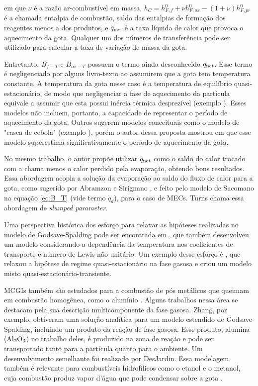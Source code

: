 em que $\nu$ é a razão ar-combustível em massa, $h_C=h^0_{F,f} + \nu h^0_{F,ox} - (1+\nu)h^0_{F,pr}$ é a chamada entalpia de combustão, saldo das entalpias de formação dos reagentes menos a dos produtos, e $\dot q_{\mathrm{net}}$ é a taxa líquida de calor que provoca o aquecimento da gota.
Qualquer um dos números de transferência pode ser utilizado para calcular a taxa de variação de massa da gota.

Entretanto, $B_{f-T}$ e $B_{ox-T}$ possuem o termo ainda desconhecido $\dot q_{\mathrm{net}}$.
Esse termo é negligenciado por alguns livro-texto \cite{Glassman2008,Williams1985} ao assumirem que a gota tem temperatura constante. 
A temperatura da gota nesse caso é a temperatura de equilíbrio quasi-estacionário, de modo que negligenciar a fase de aquecimento da partícula equivale a assumir que esta possui inércia térmica desprezível (exemplo \cite{Turns2000,Glassman2008}). 
Esses modelos não incluem, portanto, a capacidade de representar o  período de aquecimento da gota.
Outros sugerem modelos conceituais como o modelo de "casca de cebola" (exemplo \cite[p. 385]{Turns2000}), porém o autor dessa proposta mostrou em \cite{HenningsJ2024MT} que esse modelo superestima significativamente o período de aquecimento da gota.

No mesmo trabalho, o autor propõe utilizar $\dot q_{\mathrm{net}}$ como o saldo do calor trocado com a chama menos o calor perdido pela evaporação, obtendo bons resultados.
Essa abordagem acopla a solução da evaporação ao saldo do fluxo de calor para a gota, como sugerido por Abramzon e Sirignano \cite{Sirignano1989}, e feito pelo modelo de Sacomano\etal \cite{SacomanoF2022IJHMT} na equação \eqref{eq:B_T} (vide termo $\dot q_d$), para o caso de MECs.
Turns \cite{Turns2000} chama essa abordagem de \emph{slumped parameter.}

Uma perspectiva histórica dos esforço para relaxar as hipóteses realizadas no modelo de Godsave-Spalding pode ser encontrada em \cite{FachiniF1999}, que também desenvolveu um modelo considerando a dependência da temperatura nos coeficientes de transporte e número de Lewis não unitário.
Um exemplo desse esforço é \cite{UlzamaS2007}, que relaxou a hipótese de regime quasi-estacionário na fase gasosa e criou um modelo misto quasi-estacionário-transiente.%

MCGIs também são estudados para a combustão de pós metálicos que queimam em combustão homogênea, como o alumínio \cite[p. 7]{Bergthorson2015}.
Alguns trabalhos nessa área se destacam pela sua descrição multicomponente da fase gasosa. 
Zhang\etal \cite{Zhang2022_Coflow,Zhang2022_Counterflow}, por exemplo, obtiveram uma solução analítica para um modelo estendido de Godsave-Spalding, incluindo um produto da reação de fase gasosa.
Esse produto, alumina ($\mathrm{Al}_2 \mathrm{O}_3$) no trabalho deles, é produzido na zona de reação e pode ser transportado tanto para a partícula quanto para o ambiente.
Um desenvolvimento semelhante foi realizado por DesJardin\etal \cite{DesJardin2005}.
Essa modelagem também é relevante para combustíveis hidrofílicos como o etanol e o metanol, cuja combustão produz vapor d'água que pode condensar sobre a  gota \cite{SacomanoF2024CF,SacomanoF2025CF}.



